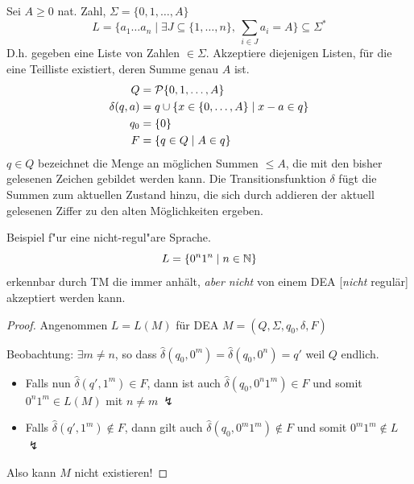 \begin{Bsp}\label{bsp:3.2}
        
        Sei $A\ge 0$ nat. Zahl, $\Sigma=\{0,1,\dots,A\}$
        \begin{equation*}
                L = \{ a_1\dots a_n \mid \exists J\subseteq \{1,\dots,n \},\ \sum_{i\in J} a_i = A \} \subseteq \Sigma^* 
        \end{equation*}
        D.h. gegeben eine Liste von Zahlen $\in\Sigma$.
        Akzeptiere diejenigen Listen, für die eine Teilliste existiert, deren Summe genau $A$ ist.
        \begin{align*}
                Q &=\mathcal{P}\{0,1,\dots,A\} \\
                \delta(q,a) &= q \cup \{ x\in \{0,\dots,A\} \mid x-a \in q \} \\
                q_0 &=\{0\} \\
                F &= \{ q\in Q \mid A \in q \}
        \end{align*}
  $q \in Q$ bezeichnet die Menge an möglichen Summen $\le A$, die mit den bisher gelesenen Zeichen gebildet werden kann.
  Die Transitionsfunktion $\delta$ fügt die Summen zum aktuellen Zustand hinzu, die sich durch addieren der aktuell gelesenen Ziffer zu den alten Möglichkeiten ergeben.
\end{Bsp}
\begin{Bsp}\label{bsp:3.3}
        Beispiel f"ur eine nicht-regul"are Sprache.
        \begin{equation*}
                L = \{ 0^n1^n \mid n\in\mathbb{N} \} 
        \end{equation*}
        erkennbar durch \ac{TM} die immer anhält, \emph{aber nicht} von einem \ac{DEA} [\emph{nicht} regulär] akzeptiert werden kann.
        \begin{proof}
                Angenommen $L=L(M)$ für \ac{DEA} $M=(Q,\Sigma,q_0,\delta,F)$
                
                Beobachtung: $\exists m\neq n$, so dass $\hat\delta(q_0,0^m)=\hat\delta(q_0,0^n)=q'$ weil $Q$ endlich.
                \begin{itemize}
                        \item Falls nun $\hat\delta(q',1^m)\in F$, dann ist auch $\hat\delta(q_0,0^n1^m)\in F$ und somit $0^n1^m\in L(M)$ mit $n\neq m\ \lightning$
                        \item Falls $\hat\delta(q',1^m)\notin F$, dann gilt auch $\hat\delta(q_0,0^m1^m)\notin F$ und somit $0^m1^m \notin L$ $\lightning$
                \end{itemize}
                Also kann $M$ nicht existieren!
        \end{proof}
\end{Bsp}

